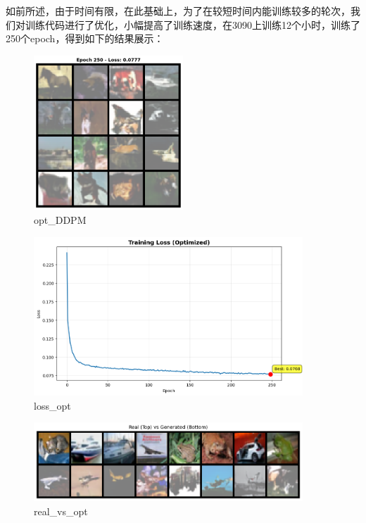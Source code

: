 \documentclass{ctexart}
\begin{document}
如前所述，由于时间有限，在此基础上，为了在较短时间内能训练较多的轮次，我们对训练代码进行了优化，小幅提高了训练速度，在3090上训练12个小时，训练了250个epoch，得到如下的结果展示：
\begin{figure}[H]
     \centering
     \includegraphics[width=0.5\textwidth]{epoch_250_samples_opt.png}
     \caption{opt\_DDPM}
     \label{fig:opt_ddpm}  %
\end{figure}

\begin{figure}[H]
     \centering
     \includegraphics[width=0.9\textwidth]{loss_curve_epoch_250_opt.png}
     \caption{loss\_opt}
     \label{fig:loss_opt}  %
\end{figure}

\begin{figure}[H]
     \centering
     \includegraphics[width=0.9\textwidth]{real_vs_opt.png}
     \caption{real\_vs\_opt}
     \label{fig:real_vs_opt}  %
\end{figure}
\end{document}
